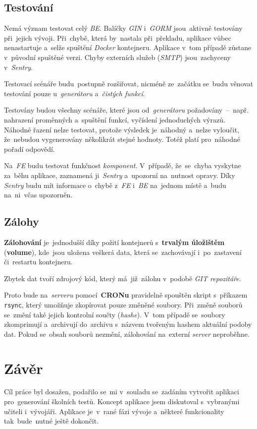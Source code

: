 \documentclass[11pt,a4paper]{report}
\let\oldacrshort\acrshort
\renewcommand{\acrshort}[1]{\emph{\normalsize\color[rgb]{0,0,0}\noindent\oldacrshort{#1}}}
\begin{document}
        \section{Testování}
            Nemá význam testovat celý \acrshort{BE}. Balíčky \emph{GIN} i~\emph{GORM} jsou~aktivně testovány při~jejich vývoji. Při~chybě, která by~nastala při~překladu, aplikace vůbec nenastartuje a~selže spuštění \emph{Docker} kontejneru. Aplikace v~tom případě zůstane v~původní spuštěné verzi. Chyby externích služeb (\emph{SMTP}) jsou~zachyceny v~\emph{Sentry}.
            
            Testovací scénáře budu~postupně rozšiřovat, nicméně ze~začátku se~budu věnovat testování pouze u~\emph{generátoru} a~\emph{čistých funkcí}.

            Testovány budou všechny scénáře, které jsou od~\emph{generátoru} požadovány~--~např. nahrazení proměnných a~spuštění funkcí, vyčíslení jednoduchých výrazů. Náhodné řazení nelze testovat, protože výsledek je~náhodný a~nelze vyloučit, že~nebudou vygenerovány několikrát stejné hodnoty. Totéž platí pro~náhodné pořadí odpovědí.

            Na~\acrshort{FE} budu testovat funkčnost \emph{komponent}. V~případě, že~se~chyba vyskytne za~běhu aplikace, zaznamená ji~\emph{Sentry} a~upozorní na~nutnost opravy. Díky \emph{Sentry} budu mít informace o~chybě z~\acrshort{FE} i~\acrshort{BE} na~jednom místě a~budu na~ni~včas upozorněn.

        \section{Zálohy}
            \textbf{Zálohování} je~jednodušší díky požití kontejnerů s~\textbf{trvalým úložištěm} (\textbf{volume}), kde~jsou uložena veškerá data, která se~zachovávají i~po~zastavení či~restartu kontejneru.
            
            Zbytek dat tvoří zdrojový kód, který má~již~zálohu v~podobě \emph{GIT repozitáře}.

            Proto bude na~\emph{serveru} pomocí~\textbf{CRONu} pravidelně spouštěn skript s~příkazem \texttt{rsync}, který umožňuje zkopírovat pouze změněné soubory. Při~změně souborů se~změní také jejich kontrolní součty (\emph{hashe}). V~tom případě se~soubory zkomprimují a~archivují do~archivu s~názvem tvořeným hashem aktuální podoby dat. Pokud se~obsah souborů nezmění, zálohování na~externí \emph{server} neproběhne.
            
    \chapter{Závěr}
        Cíl práce byl dosažen, podařilo se~mi v~souladu se~zadáním vytvořit aplikaci pro~generování školních testů. Koncept aplikace jsem diskutoval s~vybranými učiteli i~vývojáři. Aplikace je~v~rané fázi vývoje a~některé funkcionality tak~bude~nutné ještě dokončit.
        
\end{document}
